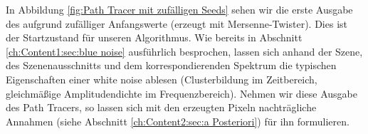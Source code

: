 In Abbildung \ref{fig:Path Tracer mit zufälligen Seeds} sehen wir die erste Ausgabe des 
aufgrund zufälliger Anfangswerte (erzeugt mit Mersenne-Twister). Dies ist der Startzustand für unseren Algorithmus.
Wie bereits in Abschnitt \ref{ch:Content1:sec:blue noise} ausführlich besprochen, lassen sich anhand der Szene, des Szenenausschnitts 
und dem korrespondierenden Spektrum die typischen Eigenschaften einer white noise ablesen (Clusterbildung im Zeitbereich, 
gleichmäßige Amplitudendichte im Frequenzbereich).
Nehmen wir diese Ausgabe des Path Tracers, so lassen sich mit den erzeugten Pixeln nachträgliche Annahmen (siehe Abschnitt \ref{ch:Content2:sec:a Posteriori})
für ihn formulieren.
